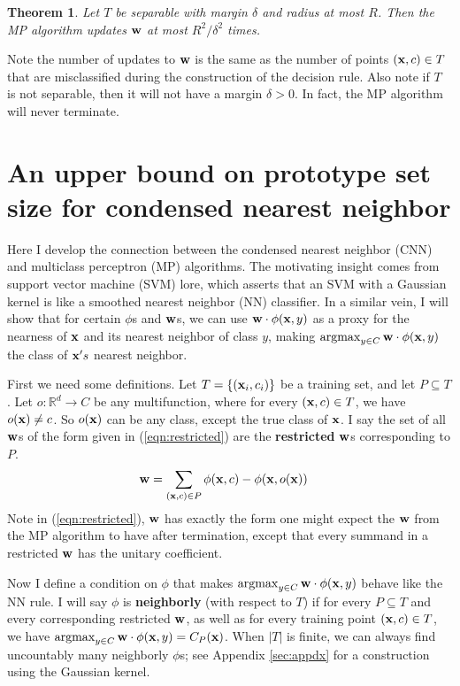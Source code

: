 \documentclass[preprint]{elsarticle}
\newcommand{\R}{ \mbox{${\mathbb R}$}}
\newcommand{\argmax}{\operatornamewithlimits{argmax}}
\newtheorem{theorem}{Theorem}
\begin{document}
\begin{theorem}
\label{thm:updates}
Let $T$ be separable with margin $\delta$ and radius at most $R$. Then the MP algorithm updates ${\bf w}$ at most $R^2/\delta^2$ times.
\end{theorem}

Note the number of updates to ${\bf w}$ is the same as the number of points $({\bf x},c) \in T$ that are misclassified during the construction of the decision rule. Also note if $T$ is not separable, then it will not have a margin $\delta > 0$. In fact, the MP algorithm will never terminate.

\section{An upper bound on prototype set size for condensed nearest neighbor}
Here I develop the connection between the condensed nearest neighbor (CNN) and multiclass perceptron (MP) algorithms. The motivating insight comes from support vector machine (SVM) lore, which asserts that an SVM with a Gaussian kernel is like a smoothed nearest neighbor (NN) classifier. In a similar vein, I will show that for certain $\phi$s and ${\bf w}$s, we can use ${\bf w} \cdot \phi({\bf x},y)$ as a proxy for the nearness of ${\bf x}$ and its nearest neighbor of class $y$, making $\argmax_{y \in C} {\bf w} \cdot \phi({\bf x},y)$ the class of ${\bf x}'s$ nearest neighbor.

First we need some definitions. Let $T = \{ ({\bf x}_i, c_i) \}$ be a training set, and let $P \subseteq T$. Let $o:\R^d \rightarrow C$ be any multifunction, where for every $({\bf x},c) \in T$, we have $o({\bf x}) \neq c$. 
So $o({\bf x})$ can be any class, except the true class of ${\bf x}$.
I say the set of all ${\bf w}$s of the form given in (\ref{eqn:restricted}) are the \textbf{restricted} ${\bf w}$s corresponding to $P$.
\begin{align}
{\bf w} 
&= \sum_{({\bf x},c) \in P} \phi({\bf x},c) - \phi({\bf x},o({\bf x}))\label{eqn:restricted}
\end{align}
Note in (\ref{eqn:restricted}), ${\bf w}$ has exactly the form one might expect the ${\bf w}$ from the MP algorithm to have after termination, except that every summand in a restricted ${\bf w}$ has the unitary coefficient.

Now I define a condition on $\phi$ that makes $\argmax_{y \in C} {\bf w} \cdot \phi({\bf x},y)$ behave like the NN rule. I will say $\phi$ is \textbf{neighborly} (with respect to $T$) if for every $P \subseteq T$ and every corresponding restricted ${\bf w}$, as well as for every training point $({\bf x},c) \in T$, we have $\argmax_{y \in C} {\bf w} \cdot \phi({\bf x},y) = C_P({\bf x})$. When $|T|$ is finite, we can always find uncountably many neighborly $\phi$s; see Appendix \ref{sec:appdx} for a construction using the Gaussian kernel.
\end{document}
